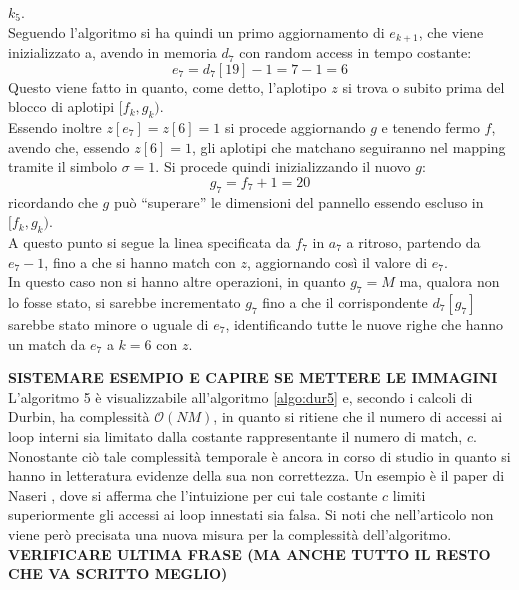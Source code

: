 \begin{esempio}
  $k_5$.\\
  Seguendo l'algoritmo si ha quindi un primo aggiornamento di $e_{k+1}$, che
  viene inizializzato a, avendo in memoria $d_7$ con random access in tempo
  costante: 
  \[e_7=d_7[19]-1=7-1=6\]
  Questo viene fatto in quanto, come detto, l'aplotipo $z$ si trova o subito
  prima del blocco di aplotipi $[f_k,g_k)$.\\
  Essendo inoltre $z[e_7]=z[6]=1$ si procede aggiornando $g$ e tenendo fermo
  $f$, avendo che, essendo $z[6]=1$, gli aplotipi che matchano seguiranno nel
  mapping tramite il simbolo $\sigma=1$. Si procede quindi inizializzando il
  nuovo $g$:
  \[g_7=f_7+1=20\]
  ricordando che $g$ può ``superare'' le dimensioni del pannello essendo
  escluso in $[f_k,g_k)$.\\
  A questo punto si segue la linea specificata da $f_7$ in $a_7$ a ritroso,
  partendo da $e_7-1$, fino a che si hanno match con $z$, aggiornando così il
  valore di $e_7$.\\
  In questo caso non si hanno altre operazioni, in quanto $g_7=M$ ma, qualora
  non lo fosse stato, si sarebbe incrementato $g_7$ fino a che il corrispondente
  $d_7[g_7]$ sarebbe stato minore o uguale di $e_7$, identificando tutte le
  nuove righe che hanno un match da $e_7$ a $k=6$ con $z$.
\end{esempio}
\textbf{SISTEMARE ESEMPIO E CAPIRE SE METTERE LE IMMAGINI}\\
L'algoritmo 5 è visualizzabile all'algoritmo \ref{algo:dur5} e, secondo i
calcoli di Durbin, ha complessità $\mathcal{O}(NM)$, in quanto si ritiene che il
numero di accessi ai loop interni sia limitato dalla costante rappresentante il
numero di match, $c$. Nonostante ciò tale complessità temporale è ancora in
corso di studio in quanto si hanno in letteratura evidenze della sua non
correttezza. Un esempio è il paper di Naseri \cite{dpbwt}, dove si afferma che
l'intuizione per cui tale costante $c$ limiti superiormente gli accessi ai loop
innestati sia falsa. Si noti che nell'articolo non viene però precisata una
nuova misura per la complessità dell'algoritmo.
\textbf{VERIFICARE ULTIMA FRASE (MA ANCHE TUTTO IL RESTO CHE VA SCRITTO MEGLIO)}
